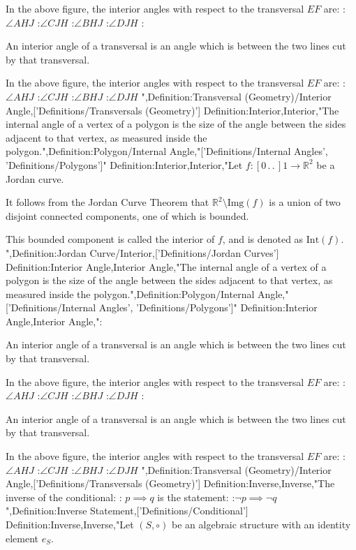 In the above figure, the interior angles with respect to the transversal $EF$ are:
:$\angle AHJ$
:$\angle CJH$
:$\angle BHJ$
:$\angle DJH$
:


An interior angle of a transversal is an angle which is between the two lines cut by that transversal.

In the above figure, the interior angles with respect to the transversal $EF$ are:
:$\angle AHJ$
:$\angle CJH$
:$\angle BHJ$
:$\angle DJH$
",Definition:Transversal (Geometry)/Interior Angle,['Definitions/Transversals (Geometry)']
Definition:Interior,Interior,"The internal angle of a vertex of a polygon is the size of the angle between the sides adjacent to that vertex, as measured inside the polygon.",Definition:Polygon/Internal Angle,"['Definitions/Internal Angles', 'Definitions/Polygons']"
Definition:Interior,Interior,"Let $f: \left[ 0 \,.\,.\,   \right]1 \to \mathbb R^2$ be a Jordan curve.


It follows from the Jordan Curve Theorem that $\mathbb R^2 \setminus \mathrm {Img} \left( f \right)$ is a union of two disjoint connected components, one of which is bounded.

This bounded component is called the interior of $f$, and is denoted as $\mathrm {Int} \left( f \right)$.
",Definition:Jordan Curve/Interior,['Definitions/Jordan Curves']
Definition:Interior Angle,Interior Angle,"The internal angle of a vertex of a polygon is the size of the angle between the sides adjacent to that vertex, as measured inside the polygon.",Definition:Polygon/Internal Angle,"['Definitions/Internal Angles', 'Definitions/Polygons']"
Definition:Interior Angle,Interior Angle,":


An interior angle of a transversal is an angle which is between the two lines cut by that transversal.

In the above figure, the interior angles with respect to the transversal $EF$ are:
:$\angle AHJ$
:$\angle CJH$
:$\angle BHJ$
:$\angle DJH$
:


An interior angle of a transversal is an angle which is between the two lines cut by that transversal.

In the above figure, the interior angles with respect to the transversal $EF$ are:
:$\angle AHJ$
:$\angle CJH$
:$\angle BHJ$
:$\angle DJH$
",Definition:Transversal (Geometry)/Interior Angle,['Definitions/Transversals (Geometry)']
Definition:Inverse,Inverse,"The inverse of the conditional:
: $p \implies q$
is the statement:
:$\neg p \implies \neg q$",Definition:Inverse Statement,['Definitions/Conditional']
Definition:Inverse,Inverse,"Let $\left( S, \circ \right)$ be an algebraic structure with an identity element $e_S$.

